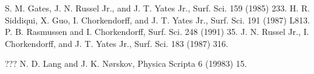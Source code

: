 \documentclass[12pt]{book}
\begin{document}
\begin{thebibliography}{99}
 S. M. Gates, J. N. Russel Jr., and  J. T. Yates Jr., Surf. Sci. 159 (1985) 233.
 H. R. Siddiqui, X. Guo, I. Chorkendorff, and J. T. Yates Jr., Surf. Sci. 191 (1987) L813.
 P. B. Rasmussen and I. Chorkendorff, Surf. Sci. 248 (1991) 35.
 J. N. Russel Jr., I. Chorkendorff, and J. T. Yates Jr., Surf. Sci. 183 (1987) 316.


 ???
 N. D. Lang and J. K. N\o rskov, Physica Scripta 6 (19983) 15.
\end{thebibliography}
\end{document}
